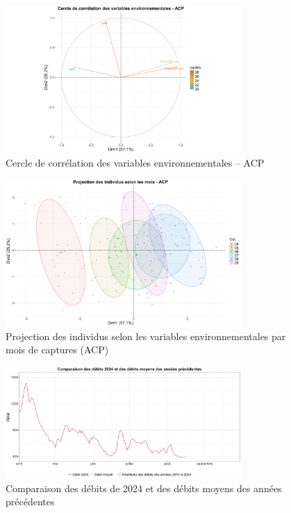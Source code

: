 \documentclass[11pt,titlepage,twoside]{article}\usepackage[]{graphicx}\usepackage[table]{xcolor}
\begin{document}
\begin{figure}[htpb]
\centering
\includegraphics[width=0.8\textwidth]{ACP.png}
\caption{Cercle de corrélation des variables environnementales – ACP}
\label{ACP}
\end{figure} 


\begin{figure}[htpb]
\centering
\includegraphics[width=0.8\textwidth]{Individus.png}
\caption{Projection des individus selon les variables environnementales par mois de captures (ACP)}
\label{Individus}
\end{figure} 

\begin{figure}[htpb]
\centering
\includegraphics[width=0.8\textwidth]{graph_debit_oral.png}
\caption{Comparaison des débits de 2024 et des débits moyens des années précédentes}
\label{graph_debit_oral}
\end{figure} 
\end{document}
